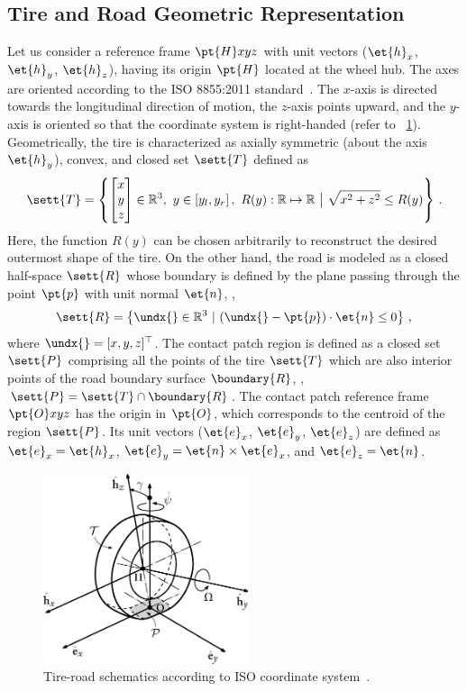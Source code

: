 \subsection{Tire and Road Geometric Representation}
\label{app3:sec:tire_road_representation}

Let us consider a reference frame $\pt{H}xyz$ with unit vectors ($\et{h}_x$, $\et{h}_y$, $\et{h}_z$),  having its origin $\pt{H}$ located at the wheel hub. The axes are oriented according to the ISO 8855:2011 standard~\cite{iso88552011}. The $x$-axis is directed towards the longitudinal direction of motion, the $z$-axis points upward, and the $y$-axis is oriented so that the coordinate system is right-handed (refer to \figurename~\ref{app3:fig:tire_iso}).  Geometrically, the tire is characterized as axially symmetric (about the axis $\et{h}_y$), convex, and closed set $\sett{T}$ defined as
%
\begin{equation*}
  \sett{T} = \left\{ \begin{bmatrix} x\\ y\\ z \end{bmatrix} \in \mathbb{R}^3, ~ y \in \left[ y_l, y_r \right], ~ R(y):\mathbb{R} \mapsto \mathbb{R} ~\big|~ \sqrt{x^2+z^2} \leq R(y) \right\} \, \text{.}
\end{equation*}
%
Here, the function $R(y)$ can be chosen arbitrarily to reconstruct the desired outermost shape of the tire. On the other hand, the road is modeled as a closed half-space $\sett{R}$ whose boundary is defined by the plane passing through the point $\pt{p}$ with unit normal $\et{n}$, \ie{},
%
\begin{equation*}
  \sett{R} = \left\{\undx{}\in\mathbb{R}^3 ~|~ (\undx{}-\pt{p})\cdot\et{n} \leq 0 \right\} \, \text{,}
\end{equation*}
%
where $\undx{} = [x,y,z]^\top$. The contact patch region is defined as a closed set $\sett{P}$ comprising all the points of the tire $\sett{T}$ which are also interior points of the road boundary surface $\boundary{R}$, \ie{}, $\sett{P} = \sett{T} \cap \boundary{R}$. The contact patch reference frame $\pt{O}xyz$ has the origin in $\pt{O}$, which corresponds to the centroid of the region $\sett{P}$. Its unit vectors ($\et{e}_x$, $\et{e}_y$, $\et{e}_z$) are defined as $\et{e}_x = \et{h}_x$, $\et{e}_y = \et{n} \times \et{e}_x$, and $\et{e}_z = \et{n}$.

\begin{figure}[htb]
  \centering
  \includegraphics[width=6.0cm]{figures/appendix_3/tire_iso}
  \caption{Tire-road schematics according to ISO coordinate system~\cite{iso88552011}.}
  \label{app3:fig:tire_iso}
\end{figure}


